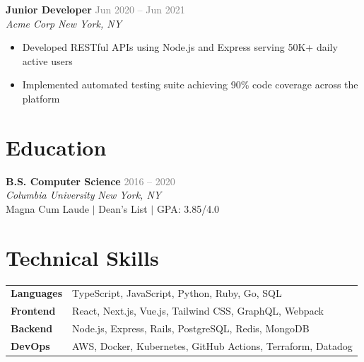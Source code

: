 \documentclass[11pt,a4paper]{article}
\begin{document}
\noindent\textbf{\color{darktext}Junior Developer} \hfill \textcolor{graytext}{Jun 2020 -- Jun 2021} \\
\textit{\color{awesome}Acme Corp} \hfill \textit{\color{lighttext}New York, NY}
\begin{itemize}[leftmargin=1.5em, topsep=2pt, itemsep=1pt]
  \item Developed RESTful APIs using Node.js and Express serving 50K+ daily active users
  \item Implemented automated testing suite achieving 90\% code coverage across the platform
\end{itemize}

\section{Education}
\vspace{2pt}
\noindent\textbf{\color{darktext}B.S. Computer Science} \hfill \textcolor{graytext}{2016 -- 2020} \\
\textit{\color{awesome}Columbia University} \hfill \textit{\color{lighttext}New York, NY} \\
\small\color{graytext} Magna Cum Laude $|$ Dean's List $|$ GPA: 3.85/4.0

\section{Technical Skills}
\vspace{2pt}
\begin{tabularx}{\textwidth}{@{}lX@{}}
  \textbf{\color{darktext}Languages} & TypeScript, JavaScript, Python, Ruby, Go, SQL \\[2pt]
  \textbf{\color{darktext}Frontend} & React, Next.js, Vue.js, Tailwind CSS, GraphQL, Webpack \\[2pt]
  \textbf{\color{darktext}Backend} & Node.js, Express, Rails, PostgreSQL, Redis, MongoDB \\[2pt]
  \textbf{\color{darktext}DevOps} & AWS, Docker, Kubernetes, GitHub Actions, Terraform, Datadog
\end{tabularx}
\end{document}
